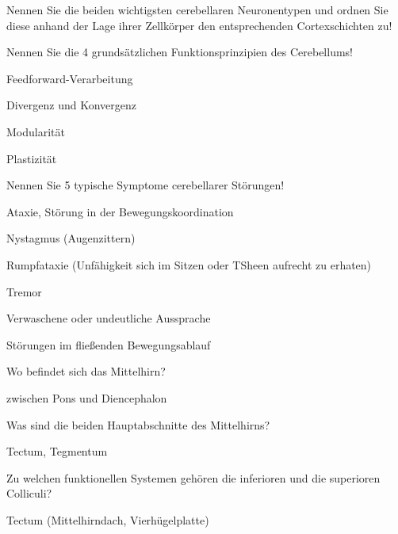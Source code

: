 \documentclass[10pt, a4paper]{exam}
\newcommand\Warning{%
 \makebox[1.4em][c]{%
 \makebox[0pt][c]{\raisebox{.1em}{\small!}}%
 \makebox[0pt][c]{\color{red}\Large$\bigtriangleup$}}}%
\begin{document}
\begin{questions}
\begin{solution}
  \end{solution}

  \question Nennen Sie die beiden wichtigsten cerebellaren Neuronentypen und ordnen Sie diese anhand der Lage ihrer Zellkörper den entsprechenden Cortexschichten zu!
  \begin{solution}

  \end{solution}

  \question Nennen Sie die 4 grundsätzlichen Funktionsprinzipien des Cerebellums!
  \begin{solution}
    \begin{itemize*}
      \item Feedforward-Verarbeitung
      \item Divergenz und Konvergenz
      \item Modularität
      \item Plastizität
    \end{itemize*}
  \end{solution}

  \question Nennen Sie 5 typische Symptome cerebellarer Störungen!
  \begin{solution}
    \begin{itemize*}
      \item Ataxie, Störung in der Bewegungskoordination
      \item Nystagmus (Augenzittern)
      \item Rumpfataxie (Unfähigkeit sich im Sitzen oder TSheen aufrecht zu erhaten)
      \item Tremor
      \item Verwaschene oder undeutliche Aussprache
      \item Störungen im fließenden Bewegungsablauf
    \end{itemize*}
  \end{solution}

  \question Wo befindet sich das Mittelhirn?
  \begin{solution}
    zwischen Pons und Diencephalon
  \end{solution}

  \question Was sind die beiden Hauptabschnitte des Mittelhirns?
  \begin{solution}
    Tectum, Tegmentum \Warning
  \end{solution}

  \question Zu welchen funktionellen Systemen gehören die inferioren und die superioren Colliculi?
  \begin{solution}
    Tectum (Mittelhirndach, Vierhügelplatte)
  \end{solution}


\end{questions}
\end{document}
